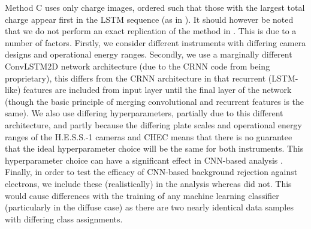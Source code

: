 Method C uses only charge images, ordered such that those with the largest total charge appear first in the LSTM sequence (as in \cite{Shilon}). It should however be noted that we do not perform an exact replication of the method in \cite{Shilon}. This is due to a number of factors. Firstly, we consider different instruments with differing camera designs and operational energy ranges. Secondly, we use a marginally different ConvLSTM2D network architecture (due to the CRNN code from \cite{Shilon} being proprietary), this differs from the CRNN architecture in that recurrent (LSTM-like) features are included from input layer until the final layer of the network (though the basic principle of merging convolutional and recurrent features is the same). We also use differing hyperparameters, partially due to this different architecture, and partly because the differing plate scales and operational energy ranges of the H.E.S.S.-1 cameras and CHEC means that there is no guarantee that the ideal hyperparameter choice will be the same for both instruments. This hyperparameter choice can have a significant effect in CNN-based analysis \cite{hyperopt}. Finally, in order to test the efficacy of CNN-based background rejection against electrons, we include these (realistically) in the analysis whereas \cite{Shilon} did not. This would cause differences with the training of any machine learning classifier (particularly in the diffuse case) as there are two nearly identical data samples with differing class assignments.


